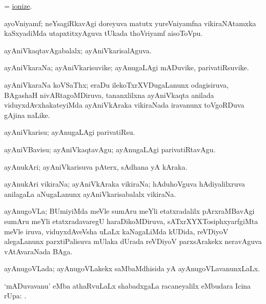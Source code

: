 \bentry
{}
\gl{\kirxvi}
\bmng
=  \hyperlink{ionize}{ionize}. 
\emng
\eentry

\bentry
{}
\gl{\nA}
\bmng
ayoVniyamf; neYsagiRkavAgi doreyuva matutx yureVniyamfna vikiraNAtamxka kaSxyadiMda utapxtitxyAguva  tUkada thoVriyamf aisoToVpu. 
\emng
\eentry

\bentry
{}
\gl{\gu}
\bmng
ayAniVkaqtavAgabalalx; ayAniVkarisalAguva. 
\emng
\eentry

\bentry
{}
\gl{\nA}
\bmng
ayAniVkaraNa; ayAniVkarisuvike; ayAnugaLAgi mADuvike, parivatiRsuvike. 
\emng
\eentry

\bentry
{}
\gl{\nA}
\bmng
ayAniVkaraNa koVSaThx; eraDu ilekoTxrXVDugaLanunx odagisiruva, BAgashaH nivARtagoMDiruva, tananxlilxna ayAniVkaqta anilada viduyxdAvxhakateyiMda ayAniVkAraka vikiraNada iravanunx toVgoRDuva gAjina naLike. 
\emng
\eentry

\bentry
{}
\gl{\sakirx}
\bmng
ayAniVkarisu; ayAnugaLAgi parivatiRsu. 
\emng

\noindent 
\gl{\akirx}
\bmng
ayAniVBavisu; ayAniVkaqtavAgu; ayAnugaLAgi parivatiRtavAgu. 
\emng
\eentry

\bentry
{}
\gl{\nA}
\bmng
ayAnukAri; ayAniVkarisuva pAterx, sAdhana yA kAraka. 
\emng
\eentry

\bentry
{}
\gl{\nA}
\bmng
ayAnukAri vikiraNa; ayAniVkAraka vikiraNa; hAduhoVguva hAdiyalilxruva anilagaLa aNugaLanunx ayAniVkarisabalalx vikiraNa. 
\emng
\eentry

\bentry
{}
\gl{\nA}
\bmng
ayAnugoVLa; BUmiyiMda meVle sumAru  meYli etatxradalilx pArxraMBavAgi sumAru  meYli etatxradavaregU haraDikoMDiruva, sATxrXYXTosiphxyarfgiMta meVle iruva, viduyxdAveVsha uLaLx kaNagaLiMda kUDida, reVDiyoV alegaLanunx parxtiPalisuva mUlaka dUrada reVDiyoV parxsArakekx neravAguva vAtAvaraNada BAga. 
\emng
\eentry

\bentry
{}
\gl{\gu}
\bmng
ayAnugoVLada; ayAnugoVLakekx saMbaMdhisida yA ayAnugoVLavanunxLaLx. 
\emng
\eentry

\bentry
{}
\gl{\uparx}
\bmng
`mADuvavanu' eMba athaRvuLaLx shabadxgaLa racaneyalilx  eMbudara Icina rUpa: . 
\emng
\eentry

